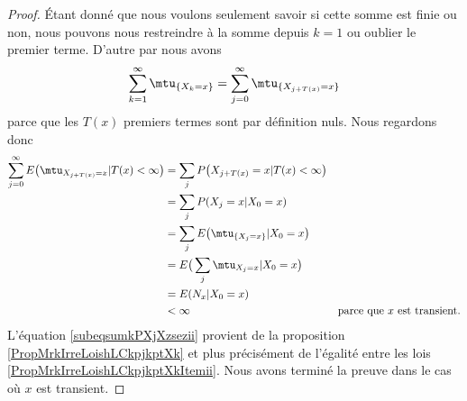 \begin{proof}
    Étant donné que nous voulons seulement savoir si cette somme est finie ou non, nous pouvons nous restreindre à la somme depuis \( k=1\) ou oublier le premier terme. D'autre par nous avons
    \begin{equation}
        \sum_{k=1}^{\infty}\mtu_{\{ X_k=x \}}=\sum_{j=0}^{\infty}\mtu_{\{ X_{j+T(x)}=x \}}
    \end{equation}
    parce que les \( T(x)\) premiers termes sont par définition nuls. Nous regardons donc
    \begin{subequations}
        \begin{align}
            \sum_{j=0}^{\infty}E\big( \mtu_{X_{j+T(x)}=x}|T(x)<\infty \big)&=\sum_{j}P\big( X_{j+T(x)}=x|T(x)<\infty \big)\\
            &=\sum_jP(X_j=x|X_0=x)  \label{subeqsumkPXjXzsezii}\\
            &=\sum_jE\big( \mtu_{\{ X_j=x \}}|X_0=x \big)\\
            &=E\big( \sum_j\mtu_{X_j=x}|X_0=x \big)\\
            &=E(N_x|X_0=x)\\
            &<\infty    &\text{parce que \( x\) est transient.}
        \end{align}
    \end{subequations}
    L'équation \eqref{subeqsumkPXjXzsezii} provient de la proposition \ref{PropMrkIrreLoishLCkpjkptXk} et plus précisément de l'égalité entre les lois \eqref{PropMrkIrreLoishLCkpjkptXkItemii}. Nous avons terminé la preuve dans le cas où \( x\) est transient.


\end{proof}
